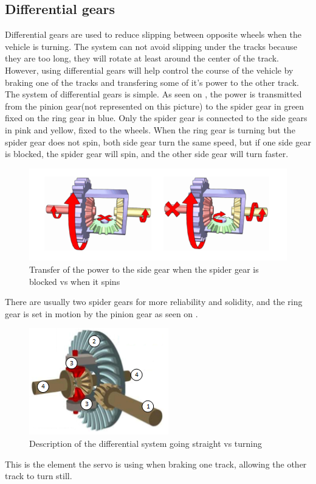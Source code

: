 \subsection{Differential gears}

Differential gears are used to reduce slipping between opposite wheels when the vehicle is turning. The system can not avoid slipping under the tracks because they are too long, they will rotate at least around the center of the track. However, using differential gears will help control the course of the vehicle by braking one of the tracks and transfering some of it's power to the other track.\\

The system of differential gears is simple. As seen on , the power is transmitted from the pinion gear(not represented on this picture) to the spider gear in green fixed on the ring gear in blue. Only the spider gear is connected to the side gears in pink and yellow, fixed to the wheels.
When the ring gear is turning but the spider gear does not spin, both side gear turn the same speed, but if one side gear is blocked, the spider gear will spin,  and the other side gear will turn faster.\\

\begin{figure}[H]
	\centering
	\includegraphics[scale=0.13]{figures/diffGearLight}
	\caption{Transfer of the power to the side gear when the spider gear is blocked vs when it spins}
	\label{diffGearLight}
\end{figure}

There are usually two spider gears for more reliability and solidity, and the ring gear is set in motion by the pinion gear as seen on .\\

\begin{figure}[H]
	\centering
	\includegraphics[scale=0.14]{figures/diffGearFull}
	\caption{Description of the differential system going straight vs turning}
	\label{diffGearFull}
\end{figure}

This is the element the servo is using when braking one track, allowing the other track to turn still.\\